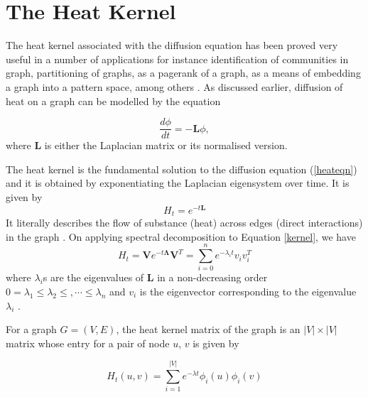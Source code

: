 \documentclass[10pt,a4paper]{article}
\begin{document}
       
        \newpage
        \section{The Heat Kernel}
        The heat kernel associated with the diffusion equation has been proved very useful in a number of applications for instance identification of communities in graph,  partitioning of graphs, as a pagerank of a graph, as a means of embedding a graph into a pattern space, among others \citep{chung2007heat,chung2009local,kloster2014heat}. 
        As discussed earlier, diffusion of heat on a graph can be modelled by the equation 
        
        \begin{equation}
        \frac{d \phi}{dt} = -\mathbf{L} \phi,
        \label{heateqn}
        \end{equation}
        where $\mathbf{L}$ is either the Laplacian matrix or its normalised version. 
        
        The heat kernel is the fundamental solution to the diffusion equation (\ref{heateqn}) and it is obtained by exponentiating the Laplacian eigensystem over time. It is given by
        \begin{equation}
        H_t = e^{-t \mathbf{L}} 
        \label{kernel}
        \end{equation}
        It literally describes the flow of substance (heat) across edges (direct interactions) in the graph \citep{xiao2009graph}.
        On applying spectral decomposition to Equation \ref{kernel}, we have 
        \begin{equation}
        H_t = \mathbf{V} e^{-t \mathbf{\Lambda}} \mathbf{V}^T =  \sum_{i=0}^n e^{-\lambda_i t} v_i v_i^T 
        \label{decomp}
        \end{equation}
        where $\lambda_i$s are the eigenvalues of $\mathbf{L}$ in a non-decreasing order $0=\lambda_1 \leq  \lambda_2 \leq, \cdots \leq \lambda_n$ and $v_i$ is the eigenvector corresponding to the eigenvalue $\lambda_i$ \citep{anton2007elementary}.
        
        For a graph $G=(V,E)$, the heat kernel matrix of the graph is an $|V| \times |V|$ matrix whose entry for a pair of node $u$, $v$ is given by 
        
        \begin{equation}
        H_t(u,v) = \sum_{i=1}^{|V|} e^{-\lambda t} \phi_i(u) \phi_i(v)
        \end{equation} 
       
\end{document}
